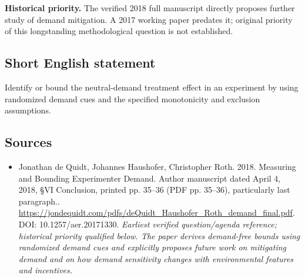 \documentclass[11pt]{article}
\begin{document}
\par\textbf{Historical priority.} The verified 2018 full manuscript directly proposes further study of demand mitigation. A 2017 working paper predates it; original priority of this longstanding methodological question is not established.

\subsection{Short English statement}
Identify or bound the neutral-demand treatment effect in an experiment by using randomized demand cues and the specified monotonicity and exclusion assumptions.

\subsection{Sources}
\begin{itemize}\raggedright
\item[\textnormal{[S1]}]\hypertarget{source:30007589:1}{} Jonathan de Quidt, Johannes Haushofer, Christopher Roth. 2018. Measuring and Bounding Experimenter Demand. Author manuscript dated April 4, 2018, §VI Conclusion, printed pp. 35–36 (PDF pp. 35–36), particularly last paragraph..
\url{https://jondequidt.com/pdfs/deQuidt_Haushofer_Roth_demand_final.pdf}.
DOI: 10.1257/aer.20171330.
{\small\textit{Earliest verified question/agenda reference; historical priority qualified below. The paper derives demand-free bounds using randomized demand cues and explicitly proposes future work on mitigating demand and on how demand sensitivity changes with environmental features and incentives.}}
\end{itemize}
\end{document}
